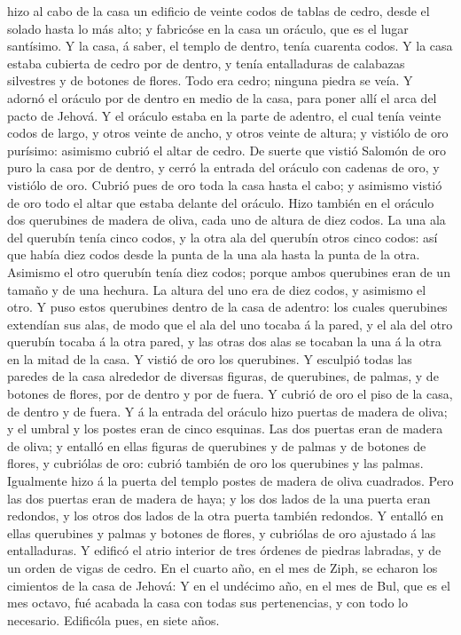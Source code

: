 hizo al cabo de la casa un edificio de veinte codos de tablas de cedro,
desde el solado hasta lo más alto; y fabricóse en la casa un oráculo,
que es el lugar santísimo.  Y la casa, á saber, el templo
de dentro, tenía cuarenta codos.  Y la casa estaba
cubierta de cedro por de dentro, y tenía entalladuras de calabazas
silvestres y de botones de flores. Todo era cedro; ninguna piedra se
veía.  Y adornó el oráculo por de dentro en medio de la
casa, para poner allí el arca del pacto de Jehová.  Y el
oráculo estaba en la parte de adentro, el cual tenía veinte codos de
largo, y otros veinte de ancho, y otros veinte de altura; y vistiólo de
oro purísimo: asimismo cubrió el altar de cedro.  De
suerte que vistió Salomón de oro puro la casa por de dentro, y cerró la
entrada del oráculo con cadenas de oro, y vistiólo de oro.
 Cubrió pues de oro toda la casa hasta el cabo; y
asimismo vistió de oro todo el altar que estaba delante del oráculo.
 Hizo también en el oráculo dos querubines de madera de
oliva, cada uno de altura de diez codos.  La una ala del
querubín tenía cinco codos, y la otra ala del querubín otros cinco
codos: así que había diez codos desde la punta de la una ala hasta la
punta de la otra.  Asimismo el otro querubín tenía diez
codos; porque ambos querubines eran de un tamaño y de una hechura.
 La altura del uno era de diez codos, y asimismo el otro.
 Y puso estos querubines dentro de la casa de adentro:
los cuales querubines extendían sus alas, de modo que el ala del uno
tocaba á la pared, y el ala del otro querubín tocaba á la otra pared, y
las otras dos alas se tocaban la una á la otra en la mitad de la casa.
 Y vistió de oro los querubines.  Y
esculpió todas las paredes de la casa alrededor de diversas figuras, de
querubines, de palmas, y de botones de flores, por de dentro y por de
fuera.  Y cubrió de oro el piso de la casa, de dentro y
de fuera.  Y á la entrada del oráculo hizo puertas de
madera de oliva; y el umbral y los postes eran de cinco esquinas.
 Las dos puertas eran de madera de oliva; y entalló en
ellas figuras de querubines y de palmas y de botones de flores, y
cubriólas de oro: cubrió también de oro los querubines y las palmas.
 Igualmente hizo á la puerta del templo postes de madera
de oliva cuadrados.  Pero las dos puertas eran de madera
de haya; y los dos lados de la una puerta eran redondos, y los otros dos
lados de la otra puerta también redondos.  Y entalló en
ellas querubines y palmas y botones de flores, y cubriólas de oro
ajustado á las entalladuras.  Y edificó el atrio interior
de tres órdenes de piedras labradas, y de un orden de vigas de cedro.
 En el cuarto año, en el mes de Ziph, se echaron los
cimientos de la casa de Jehová:  Y en el undécimo año, en
el mes de Bul, que es el mes octavo, fué acabada la casa con todas sus
pertenencias, y con todo lo necesario. Edificóla pues, en siete años.

